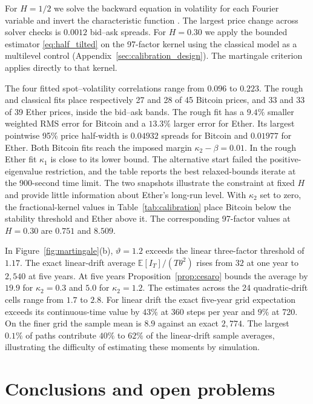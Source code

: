 \documentclass{rQUF2e}
\theoremstyle{plain}
\theoremstyle{definition}
\theoremstyle{remark}
\newcommand{\E}{\mathbb{E}}
\begin{document}
For $H=1/2$ we solve the backward equation in volatility for each Fourier variable and invert the characteristic function \citep{SeppRakhmonov2023}. The largest price change across solver checks is $0.0012$ bid--ask spreads. For $H=0.30$ we apply the bounded estimator \eqref{eq:half_tilted} on the 97-factor kernel using the classical model as a multilevel control (Appendix~\ref{sec:calibration_design}). The martingale criterion applies directly to that kernel.

The four fitted spot--volatility correlations range from $0.096$ to $0.223$. The rough and classical fits place respectively 27 and 28 of 45 Bitcoin prices, and 33 and 33 of 39 Ether prices, inside the bid--ask bands. The rough fit has a $9.4\%$ smaller weighted RMS error for Bitcoin and a $13.3\%$ larger error for Ether. Its largest pointwise 95\% price half-width is $0.04932$ spreads for Bitcoin and $0.01977$ for Ether. Both Bitcoin fits reach the imposed margin $\kappa_2-\beta=0.01$. In the rough Ether fit $\kappa_1$ is close to its lower bound. The alternative start failed the positive-eigenvalue restriction, and the table reports the best relaxed-bounds iterate at the 900-second time limit. The two snapshots illustrate the constraint at fixed $H$ and provide little information about Ether's long-run level. With $\kappa_2$ set to zero, the fractional-kernel values in Table~\ref{tab:calibration} place Bitcoin below the stability threshold and Ether above it. The corresponding 97-factor values at $H=0.30$ are $0.751$ and $8.509$.

In Figure~\ref{fig:martingale}(b), $\vartheta=1.2$ exceeds the linear three-factor threshold of $1.17$. The exact linear-drift average $\E[I_T]/(T\theta^2)$ rises from $32$ at one year to $2{,}540$ at five years. At five years Proposition~\ref{prop:cesaro} bounds the average by $19.9$ for $\kappa_2=0.3$ and $5.0$ for $\kappa_2=1.2$. The estimates across the 24 quadratic-drift cells range from $1.7$ to $2.8$. For linear drift the exact five-year grid expectation exceeds its continuous-time value by $43\%$ at 360 steps per year and $9\%$ at 720. On the finer grid the sample mean is $8.9$ against an exact $2{,}774$. The largest $0.1\%$ of paths contribute $40\%$ to $62\%$ of the linear-drift sample averages, illustrating the difficulty of estimating these moments by simulation.

\section{Conclusions and open problems}\label{sec:conclusion}
\end{document}
